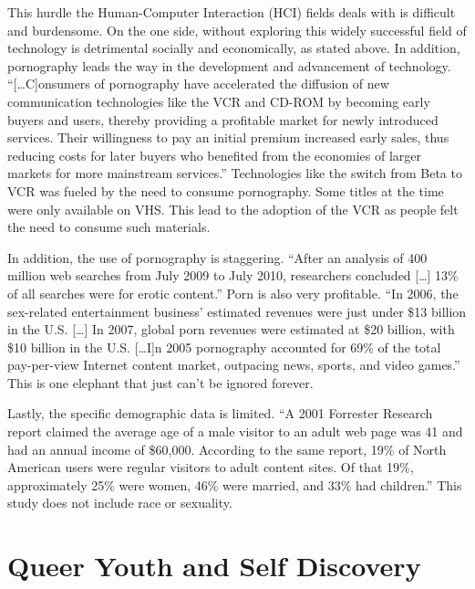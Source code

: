 \documentclass{acmsmall}
\begin{document}
This hurdle the Human-Computer Interaction (HCI) fields deals with is difficult and burdensome. On the one side, without exploring this widely successful field of technology is detrimental socially and economically, as stated above. In addition, pornography leads the way in the development and advancement of technology. ``[\ldots C]onsumers of pornography have accelerated the diffusion of new communication technologies like the VCR and CD-ROM by becoming early buyers and users, thereby providing a profitable market for newly introduced services. Their willingness to pay an initial premium increased early sales, thus reducing costs for later buyers who benefited from the economies of larger markets for more mainstream services.'' \cite{coopersmith99} Technologies like the switch from Beta to VCR was fueled by the need to consume pornography. Some titles at the time were only available on VHS. This lead to the adoption of the VCR as people felt the need to consume such materials.

In addition, the use of pornography is staggering. ``After an analysis of 400 million web searches from July 2009 to July 2010, researchers concluded [\ldots] 13\% of all searches were for erotic content.'' \cite{eyes13} Porn is also very profitable. ``In 2006, the sex-related entertainment business' estimated revenues were just under \$13 billion in the U.S. [\ldots] In 2007, global porn revenues were estimated at \$20 billion, with \$10 billion in the U.S. [\ldots I]n 2005 pornography accounted for 69\% of the total pay-per-view Internet content market, outpacing news, sports, and video games.'' \cite{eyes13} This is one elephant that just can't be ignored forever.

Lastly, the specific demographic data is limited. ``A 2001 Forrester Research report claimed the average age of a male visitor to an adult web page was 41 and had an annual income of \$60,000. According to the same report, 19\% of North American users were regular visitors to adult content sites. Of that 19\%, approximately 25\% were women, 46\% were married, and 33\% had children.'' \cite{eyes13} This study does not include race or sexuality. 

\section{Queer Youth and Self Discovery}
\end{document}
